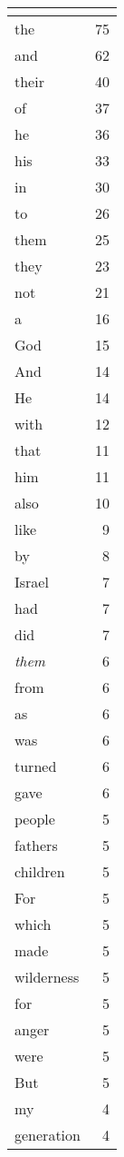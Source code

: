 \begin{center}
\begin{longtable}{l|r}
\hline \multicolumn{2}{c}{{ }} \\ \hline
\endfoot 
the & 75\\ \hline 
and & 62\\ \hline 
their & 40\\ \hline 
of & 37\\ \hline 
he & 36\\ \hline 
his & 33\\ \hline 
in & 30\\ \hline 
to & 26\\ \hline 
them & 25\\ \hline 
they & 23\\ \hline 
not & 21\\ \hline 
a & 16\\ \hline 
God & 15\\ \hline 
And & 14\\ \hline 
He & 14\\ \hline 
with & 12\\ \hline 
that & 11\\ \hline 
him & 11\\ \hline 
also & 10\\ \hline 
like & 9\\ \hline 
by & 8\\ \hline 
Israel & 7\\ \hline 
had & 7\\ \hline 
did & 7\\ \hline 
\emph{them} & 6\\ \hline 
from & 6\\ \hline 
as & 6\\ \hline 
was & 6\\ \hline 
turned & 6\\ \hline 
gave & 6\\ \hline 
people & 5\\ \hline 
fathers & 5\\ \hline 
children & 5\\ \hline 
For & 5\\ \hline 
which & 5\\ \hline 
made & 5\\ \hline 
wilderness & 5\\ \hline 
for & 5\\ \hline 
anger & 5\\ \hline 
were & 5\\ \hline 
But & 5\\ \hline 
my & 4\\ \hline 
generation & 4\\ \hline 

\end{longtable}
\end{center}

